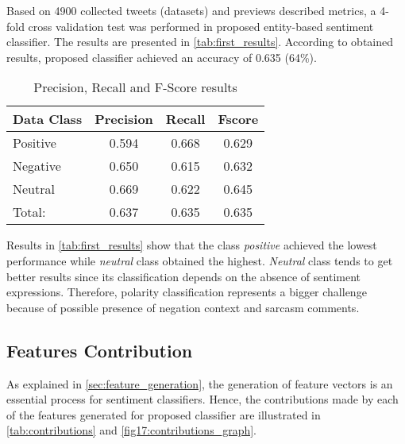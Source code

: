 Based on 4900 collected tweets (datasets) and previews described metrics, a 4-fold cross validation test was performed in proposed entity-based sentiment classifier. The results are presented in \autoref{tab:first_results}. According to obtained results, proposed classifier achieved an accuracy of 0.635 (64\%).
\begin{table}[H]
\centering
\caption{Precision, Recall and F-Score results}
\label{tab:first_results}
\begin{tabular}{l|c|c|c}
\hline
\multicolumn{1}{|c|}{{\color[HTML]{000000} \textbf{Data Class}}} & {\color[HTML]{000000} \textbf{Precision}} & \textbf{Recall} & \multicolumn{1}{c|}{\textbf{Fscore}} \\ \hline
\multicolumn{1}{|l|}{{\color[HTML]{000000} Positive}}            & {\color[HTML]{000000} 0.594}              & 0.668           & \multicolumn{1}{c|}{0.629}           \\ \hline
\multicolumn{1}{|l|}{Negative}                                   & 0.650                                     & 0.615           & \multicolumn{1}{c|}{0.632}           \\ \hline
\multicolumn{1}{|l|}{Neutral}                                    & 0.669                                     & 0.622           & \multicolumn{1}{c|}{0.645}           \\ \hline
Total:                                                           & 0.637                                     & 0.635           & 0.635                               
\end{tabular}
\end{table}

Results in \autoref{tab:first_results} show that the class \textit{positive} achieved the lowest performance while \textit{neutral} class obtained the highest. \textit{Neutral} class tends to get better results since its classification depends on the absence of sentiment expressions. Therefore, polarity classification represents a bigger challenge because of possible presence of negation context and sarcasm comments.

\subsection{Features Contribution}

As explained in \autoref{sec:feature_generation}, the generation of feature vectors is an essential process for sentiment classifiers. Hence, the contributions made by each of the features generated for proposed classifier are illustrated in \autoref{tab:contributions} and \autoref{fig17:contributions_graph}. 

